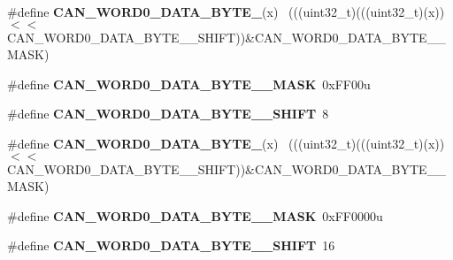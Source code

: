 \begin{DoxyCompactItemize}
\item 
\hypertarget{group___c_a_n___register___masks_ga93f067e616626ee01813da6337b42025}{}\#define {\bfseries C\+A\+N\+\_\+\+W\+O\+R\+D0\+\_\+\+D\+A\+T\+A\+\_\+\+B\+Y\+T\+E\+\_}(x)                              ~(((uint32\+\_\+t)(((uint32\+\_\+t)(x))$<$$<$C\+A\+N\+\_\+\+W\+O\+R\+D0\+\_\+\+D\+A\+T\+A\+\_\+\+B\+Y\+T\+E\+\_\+\_\+\+S\+H\+I\+F\+T))\&C\+A\+N\+\_\+\+W\+O\+R\+D0\+\_\+\+D\+A\+T\+A\+\_\+\+B\+Y\+T\+E\+\_\+\_\+\+M\+A\+S\+K)\label{group___c_a_n___register___masks_ga93f067e616626ee01813da6337b42025}

\item 
\hypertarget{group___c_a_n___register___masks_gaf5ac3a0da0156c6c331ae39e688d1a6b}{}\#define {\bfseries C\+A\+N\+\_\+\+W\+O\+R\+D0\+\_\+\+D\+A\+T\+A\+\_\+\+B\+Y\+T\+E\+\_\+\_\+\+M\+A\+S\+K}~0x\+F\+F00u\label{group___c_a_n___register___masks_gaf5ac3a0da0156c6c331ae39e688d1a6b}

\item 
\hypertarget{group___c_a_n___register___masks_ga30489eaec721b5f42b721c65d8c0cf67}{}\#define {\bfseries C\+A\+N\+\_\+\+W\+O\+R\+D0\+\_\+\+D\+A\+T\+A\+\_\+\+B\+Y\+T\+E\+\_\+\_\+\+S\+H\+I\+F\+T}~8\label{group___c_a_n___register___masks_ga30489eaec721b5f42b721c65d8c0cf67}

\item 
\hypertarget{group___c_a_n___register___masks_ga5df0dc90a87f1354757ab4c058343ea0}{}\#define {\bfseries C\+A\+N\+\_\+\+W\+O\+R\+D0\+\_\+\+D\+A\+T\+A\+\_\+\+B\+Y\+T\+E\+\_}(x)                              ~(((uint32\+\_\+t)(((uint32\+\_\+t)(x))$<$$<$C\+A\+N\+\_\+\+W\+O\+R\+D0\+\_\+\+D\+A\+T\+A\+\_\+\+B\+Y\+T\+E\+\_\+\_\+\+S\+H\+I\+F\+T))\&C\+A\+N\+\_\+\+W\+O\+R\+D0\+\_\+\+D\+A\+T\+A\+\_\+\+B\+Y\+T\+E\+\_\+\_\+\+M\+A\+S\+K)\label{group___c_a_n___register___masks_ga5df0dc90a87f1354757ab4c058343ea0}

\item 
\hypertarget{group___c_a_n___register___masks_ga9e7f294cbdc5772dc2de56ec615eb695}{}\#define {\bfseries C\+A\+N\+\_\+\+W\+O\+R\+D0\+\_\+\+D\+A\+T\+A\+\_\+\+B\+Y\+T\+E\+\_\+\_\+\+M\+A\+S\+K}~0x\+F\+F0000u\label{group___c_a_n___register___masks_ga9e7f294cbdc5772dc2de56ec615eb695}

\item 
\hypertarget{group___c_a_n___register___masks_ga93129c7dd5f1db1583bf5110179d7a4e}{}\#define {\bfseries C\+A\+N\+\_\+\+W\+O\+R\+D0\+\_\+\+D\+A\+T\+A\+\_\+\+B\+Y\+T\+E\+\_\+\_\+\+S\+H\+I\+F\+T}~16\label{group___c_a_n___register___masks_ga93129c7dd5f1db1583bf5110179d7a4e}


\end{DoxyCompactItemize}
